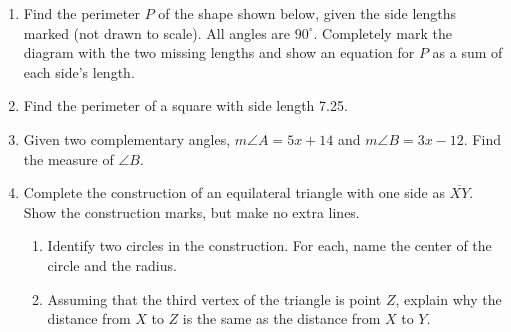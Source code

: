 \documentclass[12pt, twoside]{article}
\begin{document}
\begin{enumerate}
  \item Find the perimeter $P$ of the shape shown below, given the side lengths marked (not drawn to scale). All angles are $90^\circ$. Completely mark the diagram with the two missing lengths and show an equation for $P$ as a sum of each side's length.
  \begin{flushleft}
  \end{flushleft} \vspace{2cm}

  \item Find the perimeter of a square with side length 7.25. \vspace{3cm}

  \item Given two complementary angles, $m\angle A = 5x+14$ and $m\angle B = 3x-12$. Find the measure of $\angle B$. \vspace{3.5cm} 
 
\newpage
  \item Complete the construction of an equilateral triangle with one side as $\overline{XY}$. Show the construction marks, but make no extra lines. \vspace{3cm}
  \begin{center}
  \end{center} \vspace{3cm}
  \begin{enumerate}
    \item Identify two circles in the construction. For each, name the center of the circle and the radius.  \vspace{3cm}
    \item Assuming that the third vertex of the triangle is point $Z$, explain why the distance from $X$ to $Z$ is the same as the distance from $X$ to $Y$.
  \end{enumerate}


\end{enumerate}
\end{document}
